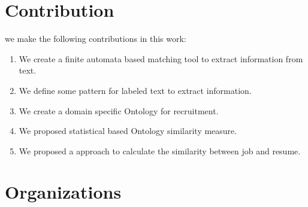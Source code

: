 \section{Contribution}

we make the following contributions in this work:

\begin{enumerate}
    \item  We create a finite automata based matching tool to extract information from text. 
    \item  We define some pattern for labeled text to extract information. 
    \item  We create a domain specific Ontology for recruitment.
    \item  We proposed statistical based Ontology similarity measure.  
    \item  We proposed a approach to calculate the similarity between job and resume.       
\end{enumerate}

\section{Organizations}
